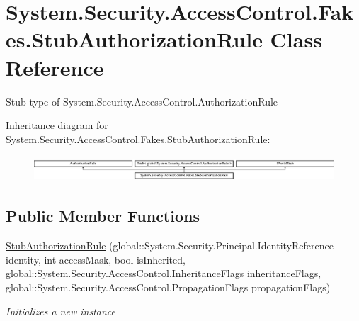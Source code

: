 \hypertarget{class_system_1_1_security_1_1_access_control_1_1_fakes_1_1_stub_authorization_rule}{\section{System.\-Security.\-Access\-Control.\-Fakes.\-Stub\-Authorization\-Rule Class Reference}
\label{class_system_1_1_security_1_1_access_control_1_1_fakes_1_1_stub_authorization_rule}
}


Stub type of System.\-Security.\-Access\-Control.\-Authorization\-Rule 


Inheritance diagram for System.\-Security.\-Access\-Control.\-Fakes.\-Stub\-Authorization\-Rule\-:\begin{figure}[H]
\begin{center}
\leavevmode
\includegraphics[height=0.954817cm]{class_system_1_1_security_1_1_access_control_1_1_fakes_1_1_stub_authorization_rule}
\end{center}
\end{figure}
\subsection*{Public Member Functions}
\begin{DoxyCompactItemize}
\item 
\hyperlink{class_system_1_1_security_1_1_access_control_1_1_fakes_1_1_stub_authorization_rule_a80746dfe2fe21147abbc6383e1d6b656}{Stub\-Authorization\-Rule} (global\-::\-System.\-Security.\-Principal.\-Identity\-Reference identity, int access\-Mask, bool is\-Inherited, global\-::\-System.\-Security.\-Access\-Control.\-Inheritance\-Flags inheritance\-Flags, global\-::\-System.\-Security.\-Access\-Control.\-Propagation\-Flags propagation\-Flags)
\begin{DoxyCompactList}\small\item\em Initializes a new instance\end{DoxyCompactList}\end{DoxyCompactItemize}
